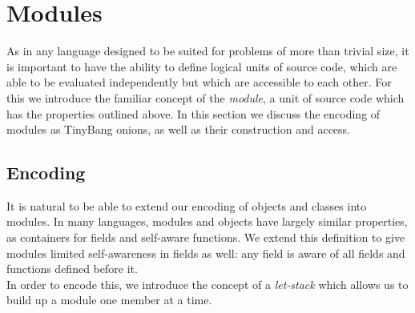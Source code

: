 \documentclass{article}
\newcommand{\translate}[2]{\ensuremath{\llbracket\texttt{#2}\rrbracket_{\textnormal{#1}}}}
\begin{document}
\section{Modules}
\label{sec-modules}
\indent As in any language designed to be suited for problems of more than trivial size, it is important to have the ability to define logical units of source code, which are able to be evaluated independently but which are accessible to each other. For this we introduce the familiar concept of the \textit{module}, a unit of source code which has the properties outlined above. In this section we discuss the encoding of modules as TinyBang onions, as well as their construction and access.

\subsection{Encoding}
\label{ss-mod-encoding}
%
% 
\indent It is natural to be able to extend our encoding of objects and classes into modules. In many languages, modules and objects have largely similar properties, as containers for fields and self-aware functions. We extend this definition to give modules limited self-awareness in fields as well: any field is aware of all fields and functions defined before it.\\
\indent In order to encode this, we introduce the concept of a \textit{let-stack} which allows us to build up a module one member at a time.
\end{document}
